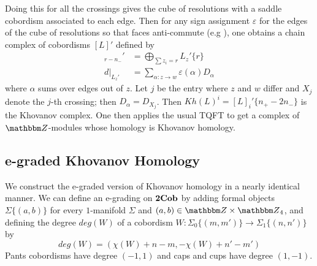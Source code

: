 \documentclass{amsart}
\theoremstyle{plain}
\theoremstyle{definition}
\theoremstyle{definition}
\numberwithin{equation}{section}
\numberwithin{theorem}{section}
\newcommand{\cat}[1]{\ensuremath{\mbox{\bfseries {\upshape {#1}}}}}
\renewcommand{\to}{\rightarrow}
\numberwithin{equation}{section}
\let\epsilon=\varepsilon
\def\Z{{\mathbbm Z}}
\begin{document}
Doing this for all the crossings gives the cube of resolutions with a saddle cobordism associated to each edge.
Then for any sign assignment $\epsilon$ for the edges of the cube of resolutions so that faces anti-commute (e.g \cite[Section 3.2]{BN1}), one obtains a chain complex of cobordisms $[L]'$ defined by
\begin{align*}
  [L]_{r-n_-}'&= \bigoplus_{\sum z_i =r} L_z'\{r\} \\
  d|_{L_z'}&=\sum\limits_{\alpha: z\to w}\epsilon(\alpha)D_{\alpha}
\end{align*}
where $\alpha$ sums over edges out of $z$.
Let $j$ be the entry where $z$ and $w$ differ and $X_j$ denote the $j$-th crossing; then $D_\alpha= D_{X_j}$.
Then $Kh(L)^i=[L]_{i}'\{n_+-2n_-\}$ is the Khovanov complex.
One then applies the usual TQFT to get a complex of $\Z$-modules whose homology is Khovanov homology.

\subsection{e-graded Khovanov Homology}\label{section: e-Khov}
We construct the e-graded version of Khovanov homology in a nearly identical manner.
We can define an e-grading on $\cat{2Cob}$ by adding formal objects $\Sigma\{(a,b)\}$ for every $1$-manifold $\Sigma$ and $(a,b)\in \Z \times \Z_4$, and defining the degree $deg(W)$ of a cobordism $W:\Sigma_0\{(m,m')\}\to \Sigma_{1}\{(n,n')\}$ by
\[
deg(W)=(\chi(W)+n-m, -\chi(W)+n'-m')
\]
Pants cobordisms have degree $(-1,1)$ and caps and cups have degree $(1,-1)$.
\end{document}
